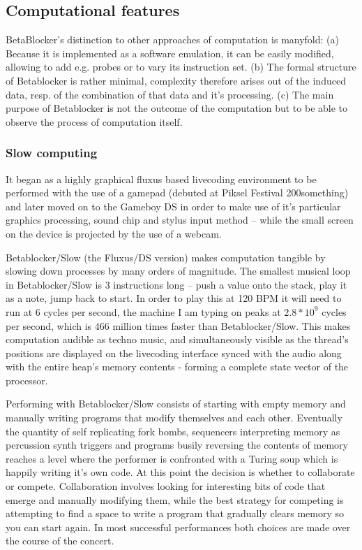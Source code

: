 \documentclass[letterpaper, 12pt]{article}
\begin{document}
\subsection{Computational features} 
\label{sub:computational_features}

BetaBlocker's distinction to other approaches of computation is manyfold:
(a) Because it is implemented as a software emulation, it can be easily modified, allowing to add e.g. probes or to vary its instruction set.
(b) The formal structure of Betablocker is rather minimal, complexity therefore arises out of the induced data, resp. of the combination of that data and it's processing.
(c) The main purpose of Betablocker is not the outcome of the computation but to be able to observe the process of computation itself. 



\subsubsection{Slow computing} 
\label{sub:slow_computing}
It began as a highly graphical fluxus based livecoding environment to be performed with the use of a gamepad (debuted at Piksel Festival 200something) and later moved on to the Gameboy DS in order to make use of it's particular graphics processing, sound chip and stylus input method -- while the small screen on the device is projected by the use of a webcam.


Betablocker/Slow (the Fluxus/DS version) makes computation tangible by slowing down processes by many orders of magnitude. 
The smallest musical loop in Betablocker/Slow is 3 instructions long -- push a value onto the stack, play it as a note, jump back to start. 
In order to play this at 120 BPM it will need to run at 6 cycles per second, the machine I am typing on peaks at $2.8*10^9$ cycles per second, which is 466 million times faster than Betablocker/Slow. This makes computation audible as techno music, and simultaneously visible as the thread's positions are displayed on the livecoding interface synced with the audio along with the entire heap's memory contents - forming a complete state vector of the processor.

Performing with Betablocker/Slow consists of starting with empty memory and manually writing programs that modify themselves and each other.
Eventually the quantity of self replicating fork bombs, sequencers interpreting memory as percussion synth triggers and programs busily reversing the contents of memory reaches a level where the performer is confronted with a Turing soup which is happily writing it's own code. 
At this point the decision is whether to collaborate or compete.
Collaboration involves looking for interesting bits of code that emerge and manually modifying them, while the best strategy for competing is attempting to find a space to write a program that gradually clears memory so you can start again. 
In most successful performances both choices are made over the course of the concert.
\end{document}
